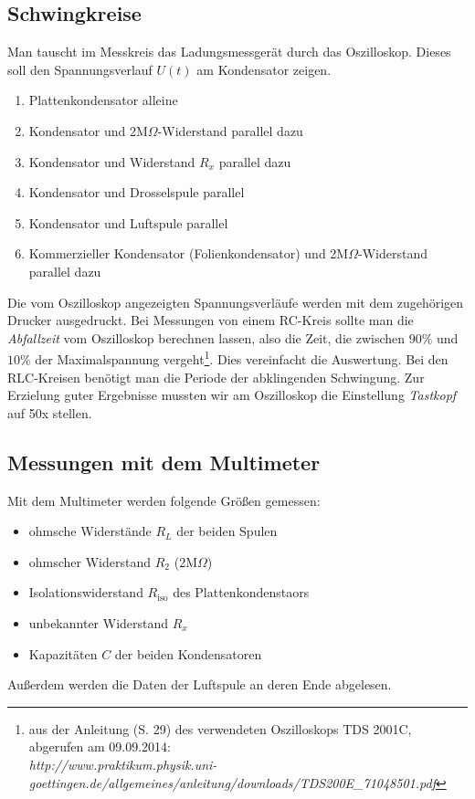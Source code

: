 \documentclass[12pt,a4paper,titlepage,headinclude,bibtotoc]{scrartcl}
\begin{document}
\subsection{Schwingkreise}
Man tauscht im Messkreis das Ladungsmessgerät durch das Oszilloskop.
Dieses soll den Spannungsverlauf $U(t)$ am Kondensator zeigen.
\begin{enumerate}
	\item Plattenkondensator alleine
	\item Kondensator und 2M$\Omega$-Widerstand parallel dazu
	\item Kondensator und Widerstand $R_x$ parallel dazu
	\item Kondensator und Drosselspule parallel
	\item Kondensator und Luftspule parallel
	\item Kommerzieller Kondensator (Folienkondensator) und 2M$\Omega$-Widerstand parallel dazu	
\end{enumerate}
Die vom Oszilloskop angezeigten Spannungsverläufe werden mit dem zugehörigen Drucker ausgedruckt.
Bei Messungen von einem RC-Kreis sollte man die \emph{Abfallzeit} vom Oszilloskop berechnen lassen, also die Zeit, die zwischen $90\%$ und $10\%$ der Maximalspannung vergeht\footnote{aus der Anleitung (S. 29) des verwendeten Oszilloskops TDS 2001C, abgerufen am 09.09.2014:\\ 
\emph{http://www.praktikum.physik.uni-goettingen.de/allgemeines/anleitung/downloads/TDS200E\_71048501.pdf}}.
Dies vereinfacht die Auswertung.
Bei den RLC-Kreisen benötigt man die Periode der abklingenden Schwingung. 
Zur Erzielung guter Ergebnisse mussten wir am Oszilloskop die Einstellung \emph{Tastkopf} auf 50x stellen.

\subsection{Messungen mit dem Multimeter}
Mit dem Multimeter werden folgende Größen gemessen:
\begin{itemize}
	\item ohmsche Widerstände $R_L$ der beiden Spulen
	\item ohmscher Widerstand $R_2$ (2M$\Omega$)
	\item Isolationswiderstand $R_\text{iso}$ des Plattenkondenstaors
	\item unbekannter Widerstand $R_x$
 	\item Kapazitäten $C$ der beiden Kondensatoren  
\end{itemize}
Außerdem werden die Daten der Luftspule an deren Ende abgelesen.
\end{document}
